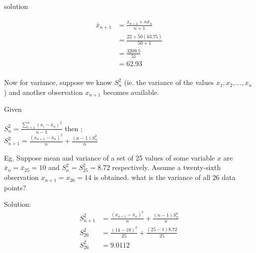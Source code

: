 solution



\begin{align*}
    \bar{x}_{n + 1} & = \frac{x_{n+1} + n\bar{x}_n}{n + 1} \\
                    & = \frac{22 + 50(63.75)}{50 + 1}      \\
                    & = \frac{3209.5}{51}                  \\
                    & = 62.93                              \\
\end{align*}

Now for variance, suppose we know $S_n^2$ (ie. the variance of the values $x_1, x_2, \ldots, x_n$) and another observation $x_{n + 1}$ becomes available.

Given
\begin{center}
    $S_n^2 = \frac{\sum_{i = 1}^{n}(x_i - \bar{x}_n)^2}{n - 1}$ then ; \\

    $S_{n + 1}^2 = \frac{(x_{n+1} - \bar{x}_n)^2}{n} + \frac{(n - 1)S_n^2}{n}$
\end{center}

Eg. Suppose mean and variance of a set of 25 values of some variable $x$ are $\bar{x}_n = \bar{x}_{25} = 10$ and $S_n^2 = S_{25}^2 = 8.72$ respectively. Assume a twenty-sixth observation $x_{n+1} = x_26 = 14$ is obtained. what is the variance of all $26$ data points?

Solution:
\begin{align*}
    S_{n + 1}^2 & = \frac{(x_{n+1} - \bar{x}_n)^2}{n} + \frac{(n - 1)S_n^2}{n} \\
    S_{26}^2    & = \frac{(14 - 10)^2}{25} + \frac{(25 - 1)8.72}{25}           \\
    S_{26}^2    & = 9.0112                                                     \\
\end{align*}



\newpage
